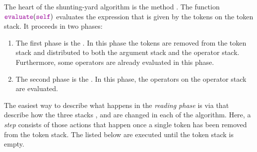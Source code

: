 The heart of the shunting-yard algorithm is the method .
The function $\mytt{evaluate}(\mytt{self})$ evaluates the expression that is given by the tokens on the
token stack.  It proceeds in two phases:
\begin{enumerate}
\item The first phase is the . In this phase
      the tokens are removed from the token stack and distributed to both the argument stack and the operator
      stack.  Furthermore, some operators are already evaluated in this phase.
\item The second phase is the .  In this phase,
      the  operators on the operator stack are evaluated.  
\end{enumerate}
The easiest way to describe what happens in the \emph{reading phase} is via
 that describe how the three stacks ,  and 
are changed in each  of the algorithm.  Here, a \emph{step} consists of those actions that happen
once a single token has been removed from the token stack.
The  listed below are executed until the token stack is empty.
